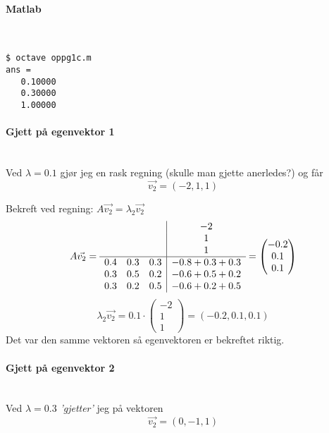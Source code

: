 \paragraph{Matlab} \mbox{} \\

\begin{lstlisting}[caption=Output]
$ octave oppg1c.m
ans =
   0.10000
   0.30000
   1.00000
\end{lstlisting}



\paragraph{Gjett på egenvektor 1} \mbox{} \\
Ved $\lambda = 0.1$ gjør jeg en rask regning (skulle man gjette anerledes?)
og får $$\vec{v_2} = (-2, 1, 1)$$

Bekreft ved regning: $A\vec{v_2} = \lambda_2 \vec{v_2}$
$$A\vec{v_2} = \begin{array}{c c c|c}
                   & & & -2 \\
                   & & & 1 \\
                   & & & 1 \\
                  \hline
                  0.4 & 0.3 & 0.3 & -0.8 + 0.3 + 0.3 \\
                  0.3 & 0.5 & 0.2 & -0.6 + 0.5 + 0.2 \\
                  0.3 & 0.2 & 0.5 & -0.6 + 0.2 + 0.5
                  \end{array}
             = \begin{pmatrix} -0.2 \\ 0.1 \\ 0.1 \end{pmatrix}$$
$$\lambda_2\vec{v_2} = 0.1\cdot \begin{pmatrix} -2 \\ 1 \\ 1 \end{pmatrix}
                     = (-0.2, 0.1, 0.1)$$
Det var den samme vektoren så egenvektoren er bekreftet riktig.



\paragraph{Gjett på egenvektor 2} \mbox{} \\
Ved $\lambda = 0.3$ \emph{'gjetter'} jeg på vektoren
$$\vec{v_2} = (0, -1, 1)$$

